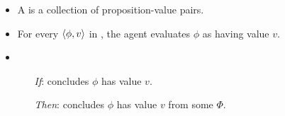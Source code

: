\begin{note}

  \begin{definition}[\pool{3}]
    \label{def:pools}

    \begin{itemize}
    \item
      A \emph{\pool{}} is a collection of proposition-value pairs.
    \item
      For every \(\langle \phi, v \rangle\) in \pool{}, the agent evaluates \(\phi\) as having value \(v\).
    \end{itemize}
    \vspace{-\baselineskip}
  \end{definition}

  \begin{assumption}[\pool{3}]
    \label{assu:concluding:pools}

    \begin{itemize}[noitemsep]
    \item
      \begin{enumerate}
      \item[\emph{If}:]
        \vAgent{} concludes \(\phi\) has value \(v\).
      \item[\emph{Then}:]
        \vAgent{} concludes \(\phi\) has value \(v\) from some \pool{} \(\Phi\).
      \end{enumerate}
    \end{itemize}
    \vspace{-\baselineskip}
  \end{assumption}


\end{note}
